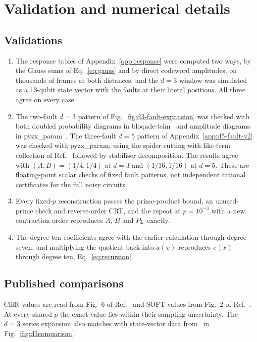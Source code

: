 
\section{Validation and numerical details}\label{app:numerics}
\subsection{Validations}
\begin{enumerate}
\item The response tables of Appendix~\ref{app:response} were computed two ways, by the Gauss sums of Eq.~\eqref{eq:gauss} and by direct codeword amplitudes, on thousands of frames at both distances, and the $d=3$ window was simulated as a 13-qubit state vector with the faults at their literal positions. All three agree on every case.
\item The two-fault $d=3$ pattern of Fig.~\ref{fig:d3-fault-expansion}
was checked with both doubled probability diagrams in bloqade-tsim~\cite{tsim} and
amplitude diagrams in pyzx\_param~\cite{pyzx_param}. The three-fault $d=5$ pattern of
Appendix~\ref{app:d5-fault-v2} was checked with pyzx\_param, using the spider cutting with like-term collection of Ref.~\cite{wan} followed by stabiliser decomposition. The results agree with $(A,B)=(1/4,1/4)$ at $d=3$ and $(1/16,1/16)$ at $d=5$.
These are floating-point scalar checks of fixed fault patterns, not
independent rational certificates for the full noisy circuits.
\item Every fixed-$p$ reconstruction passes the prime-product bound, an unused-prime check and reverse-order CRT, and the repeat at $p=10^{-3}$ with a new contraction order reproduces $A$, $B$ and $P_{\mathrm L}$ exactly.
\item The degree-ten coefficients agree with the earlier calculation through degree seven, and multiplying the quotient back into $a(x)$ reproduces $e(x)$ through degree ten, Eq.~\eqref{eq:recursion}.
\end{enumerate}

\subsection{Published comparisons}
Clifft values are read from Fig.~6 of Ref.~\cite{clifft} and SOFT values from Fig.~2 of Ref.~\cite{soft}. At every shared $p$ the exact value lies within their sampling uncertainty. The $d=3$ series expansion also matches with state-vector data from~\cite{msc} in Fig.~\ref{fig:d3comparison}.

